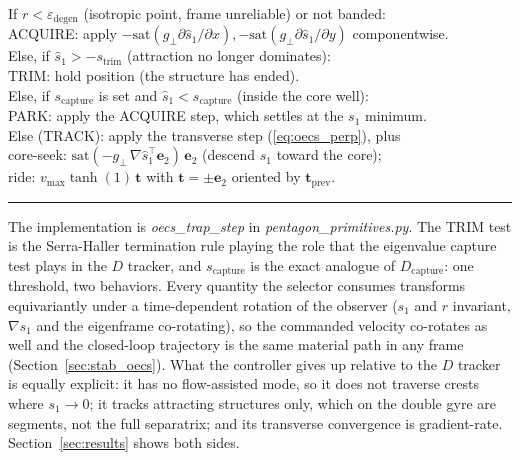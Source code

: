 \documentclass[lettersize,journal]{IEEEtran}
\begin{document}
\vspace{3pt}
\noindent If $r < \varepsilon_{\text{degen}}$ (isotropic point, frame
unreliable) or not banded:\\
\hspace*{1.5em} ACQUIRE: apply
$-\mathrm{sat}(g_\perp \partial\hat{s}_1/\partial x),
 -\mathrm{sat}(g_\perp \partial\hat{s}_1/\partial y)$
componentwise.\\
Else, if $\hat{s}_1 > -s_{\text{trim}}$ (attraction no longer
dominates):\\
\hspace*{1.5em} TRIM: hold position (the structure has ended).\\
Else, if $s_{\text{capture}}$ is set and $\hat{s}_1 <
s_{\text{capture}}$ (inside the core well):\\
\hspace*{1.5em} PARK: apply the ACQUIRE step, which settles at the
$s_1$ minimum.\\
Else (TRACK): apply the transverse step (\ref{eq:oecs_perp}), plus\\
\hspace*{1.5em} core-seek: $\mathrm{sat}(-g_\perp\,
\nabla\hat{s}_1^\top \mathbf{e}_2)\,\mathbf{e}_2$ (descend $s_1$ toward
the core);\\
\hspace*{1.5em} ride: $v_{\max}\tanh(1)\,\mathbf{t}$ with $\mathbf{t} =
\pm\mathbf{e}_2$ oriented by $\mathbf{t}_{\text{prev}}$.
\vspace{4pt}
\hrule
\vspace{4pt}

The implementation is \textit{oecs\_trap\_step} in
\textit{pentagon\_primitives.py}. The TRIM test is the Serra-Haller
termination rule playing the role that the eigenvalue capture test
plays in the $D$ tracker, and $s_{\text{capture}}$ is the exact analogue of
$D_{\text{capture}}$: one threshold, two behaviors. Every quantity the
selector consumes transforms equivariantly under a time-dependent
rotation of the observer ($s_1$ and $r$ invariant, $\nabla s_1$ and the
eigenframe co-rotating), so the commanded velocity co-rotates as well
and the closed-loop trajectory is the same material path in any frame
(Section~\ref{sec:stab_oecs}). What the controller gives up relative to
the $D$ tracker is equally explicit: it has no flow-assisted mode, so it does
not traverse crests where $s_1 \to 0$; it tracks attracting structures
only, which on the double gyre are segments, not the full separatrix;
and its transverse convergence is gradient-rate. Section~\ref{sec:results}
shows both sides.
\end{document}
